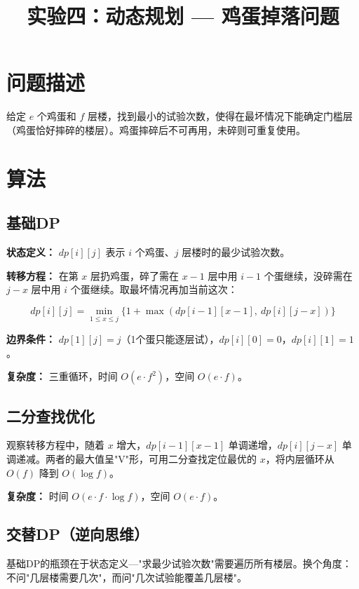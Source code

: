\documentclass[12pt,a4paper]{article}
\title{实验四：动态规划 --- 鸡蛋掉落问题}
\author{}
\date{}
\begin{document}
\maketitle

\section{问题描述}

给定 $e$ 个鸡蛋和 $f$ 层楼，找到最小的试验次数，使得在最坏情况下能确定门槛层（鸡蛋恰好摔碎的楼层）。鸡蛋摔碎后不可再用，未碎则可重复使用。

\section{算法}

\subsection{基础DP}

\textbf{状态定义：} $dp[i][j]$ 表示 $i$ 个鸡蛋、$j$ 层楼时的最少试验次数。

\textbf{转移方程：} 在第 $x$ 层扔鸡蛋，碎了需在 $x-1$ 层中用 $i-1$ 个蛋继续，没碎需在 $j-x$ 层中用 $i$ 个蛋继续。取最坏情况再加当前这次：

\begin{equation}
dp[i][j] = \min_{1 \leq x \leq j} \{ 1 + \max(dp[i-1][x-1],\ dp[i][j-x]) \}
\end{equation}

\textbf{边界条件：} $dp[1][j]=j$（1个蛋只能逐层试），$dp[i][0]=0$，$dp[i][1]=1$。

\textbf{复杂度：} 三重循环，时间 $O(e \cdot f^2)$，空间 $O(e \cdot f)$。

\subsection{二分查找优化}

观察转移方程中，随着 $x$ 增大，$dp[i-1][x-1]$ 单调递增，$dp[i][j-x]$ 单调递减。两者的最大值呈"V"形，可用二分查找定位最优的 $x$，将内层循环从 $O(f)$ 降到 $O(\log f)$。

\textbf{复杂度：} 时间 $O(e \cdot f \cdot \log f)$，空间 $O(e \cdot f)$。

\subsection{交替DP（逆向思维）}

基础DP的瓶颈在于状态定义---"求最少试验次数"需要遍历所有楼层。换个角度：不问"几层楼需要几次"，而问"几次试验能覆盖几层楼"。
\end{document}
